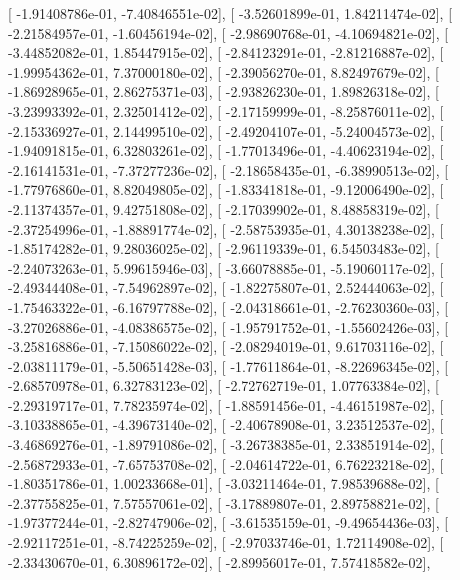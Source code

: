 \documentclass{article}
\begin{document}
       [ -1.91408786e-01,  -7.40846551e-02],
       [ -3.52601899e-01,   1.84211474e-02],
       [ -2.21584957e-01,  -1.60456194e-02],
       [ -2.98690768e-01,  -4.10694821e-02],
       [ -3.44852082e-01,   1.85447915e-02],
       [ -2.84123291e-01,  -2.81216887e-02],
       [ -1.99954362e-01,   7.37000180e-02],
       [ -2.39056270e-01,   8.82497679e-02],
       [ -1.86928965e-01,   2.86275371e-03],
       [ -2.93826230e-01,   1.89826318e-02],
       [ -3.23993392e-01,   2.32501412e-02],
       [ -2.17159999e-01,  -8.25876011e-02],
       [ -2.15336927e-01,   2.14499510e-02],
       [ -2.49204107e-01,  -5.24004573e-02],
       [ -1.94091815e-01,   6.32803261e-02],
       [ -1.77013496e-01,  -4.40623194e-02],
       [ -2.16141531e-01,  -7.37277236e-02],
       [ -2.18658435e-01,  -6.38990513e-02],
       [ -1.77976860e-01,   8.82049805e-02],
       [ -1.83341818e-01,  -9.12006490e-02],
       [ -2.11374357e-01,   9.42751808e-02],
       [ -2.17039902e-01,   8.48858319e-02],
       [ -2.37254996e-01,  -1.88891774e-02],
       [ -2.58753935e-01,   4.30138238e-02],
       [ -1.85174282e-01,   9.28036025e-02],
       [ -2.96119339e-01,   6.54503483e-02],
       [ -2.24073263e-01,   5.99615946e-03],
       [ -3.66078885e-01,  -5.19060117e-02],
       [ -2.49344408e-01,  -7.54962897e-02],
       [ -1.82275807e-01,   2.52444063e-02],
       [ -1.75463322e-01,  -6.16797788e-02],
       [ -2.04318661e-01,  -2.76230360e-03],
       [ -3.27026886e-01,  -4.08386575e-02],
       [ -1.95791752e-01,  -1.55602426e-03],
       [ -3.25816886e-01,  -7.15086022e-02],
       [ -2.08294019e-01,   9.61703116e-02],
       [ -2.03811179e-01,  -5.50651428e-03],
       [ -1.77611864e-01,  -8.22696345e-02],
       [ -2.68570978e-01,   6.32783123e-02],
       [ -2.72762719e-01,   1.07763384e-02],
       [ -2.29319717e-01,   7.78235974e-02],
       [ -1.88591456e-01,  -4.46151987e-02],
       [ -3.10338865e-01,  -4.39673140e-02],
       [ -2.40678908e-01,   3.23512537e-02],
       [ -3.46869276e-01,  -1.89791086e-02],
       [ -3.26738385e-01,   2.33851914e-02],
       [ -2.56872933e-01,  -7.65753708e-02],
       [ -2.04614722e-01,   6.76223218e-02],
       [ -1.80351786e-01,   1.00233668e-01],
       [ -3.03211464e-01,   7.98539688e-02],
       [ -2.37755825e-01,   7.57557061e-02],
       [ -3.17889807e-01,   2.89758821e-02],
       [ -1.97377244e-01,  -2.82747906e-02],
       [ -3.61535159e-01,  -9.49654436e-03],
       [ -2.92117251e-01,  -8.74225259e-02],
       [ -2.97033746e-01,   1.72114908e-02],
       [ -2.33430670e-01,   6.30896172e-02],
       [ -2.89956017e-01,   7.57418582e-02],
\end{document}
